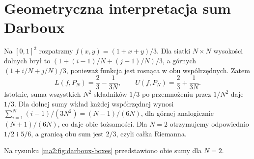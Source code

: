 \section{Geometryczna interpretacja sum Darboux}

Na $[0,1]^2$ rozpatrzmy $f(x,y)=(1+x+y)/3$.
Dla siatki $N\times N$ wysokości dolnych brył to
$(1+(i-1)/N+(j-1)/N)/3$, a górnych
$(1+i/N+j/N)/3$, ponieważ funkcja jest rosnąca
w obu współrzędnych. Zatem
\[
 L(f,P_N)=\frac23-\frac{1}{3N},\qquad
 U(f,P_N)=\frac23+\frac{1}{3N}.
\]
Istotnie, suma wszystkich $N^2$ składników
$1/3$ po przemnożeniu przez $1/N^2$ daje $1/3$.
Dla dolnej sumy wkład każdej współrzędnej
wynosi $\sum_{i=1}^N(i-1)/(3N^2)=(N-1)/(6N)$,
dla górnej analogicznie $(N+1)/(6N)$,
co daje obie tożsamości.
Dla $N=2$ otrzymujemy odpowiednio $1/2$ i $5/6$,
a granicą obu sum jest $2/3$, czyli całka Riemanna.

Na rysunku \ref{ma2:fig:darboux-boxes} przedstawiono
obie sumy dla $N=2$.

